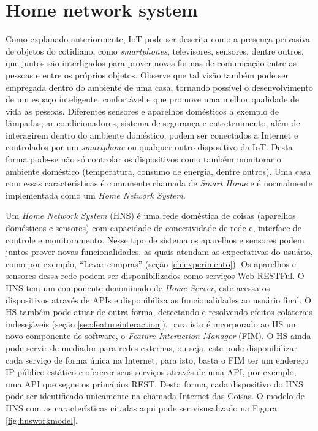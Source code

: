 \section{Home network system}
\label{sec:hns}
Como explanado anteriormente, IoT pode ser descrita como a presença pervasiva de objetos do cotidiano, como \textit{smartphones}, televisores, sensores, dentre outros, que juntos são interligados para prover novas formas de comunicação entre as pessoas e entre os próprios objetos. Observe que tal visão também pode ser empregada dentro do ambiente de uma casa, tornando possível o desenvolvimento de um espaço inteligente, confortável e que promove uma melhor qualidade de vida as pessoas. Diferentes sensores e aparelhos domésticos a exemplo de lâmpadas, ar-condicionadores, sistema de segurança e entretenimento, além de interagirem dentro do ambiente doméstico, podem ser conectados a Internet e controlados por um \textit{smartphone} ou qualquer outro dispositivo da IoT. Desta forma pode-se não só controlar os dispositivos como também monitorar o ambiente doméstico (temperatura, consumo de energia, dentre outros). Uma casa com essas características é comumente chamada de \textit{Smart Home} e é normalmente implementada como um \textit{Home Network System}.\cite{Piyare:2013}

Um \textit{Home Network System} (HNS) é uma rede doméstica de coisas (aparelhos domésticos e sensores) com capacidade de conectividade de rede e, interface de controle e monitoramento. Nesse tipo de sistema os aparelhos e sensores podem juntos prover novas funcionalidades, as quais atendam as expectativas do usuário, como por exemplo, ``Levar compras'' (seção \ref{ch:experimento}). Os aparelhos e sensores dessa rede podem ser disponibilizados como serviços Web RESTFul. O HNS tem um componente denominado de \textit{Home Server}, este acessa os dispositivos através de APIs e disponibiliza as funcionalidades ao usuário final. O HS também pode atuar de outra forma, detectando e resolvendo efeitos colaterais indesejáveis (seção \ref{sec:featureinteraction}), para isto é incorporado ao HS um novo componente de software, o \textit{Feature Interaction Manager} (FIM). O HS ainda pode servir de mediador para redes externas, ou seja, este pode disponibilizar cada serviço de forma única na Internet, para isto, basta o FIM ter um endereço IP público estático e oferecer seus serviços através de uma API, por exemplo, uma API que segue os princípios REST. Desta forma, cada dispositivo do HNS pode ser identificado unicamente na chamada Internet das Coisas.\cite{Nakamura:2009}\cite{Ikegami:2013} O modelo de HNS com as características citadas aqui pode ser visusalizado na Figura \ref{fig:hnsworkmodel}.

